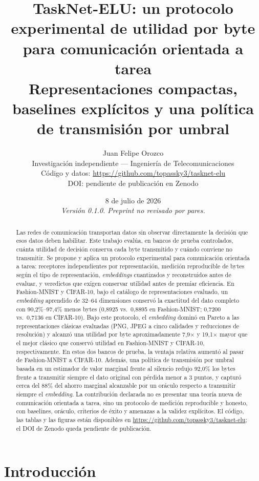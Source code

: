 \documentclass[11pt,letterpaper]{article}
\title{\bfseries TaskNet-ELU: un protocolo experimental de utilidad por byte\\
para comunicaci\'on orientada a tarea\\[0.35em]
\large Representaciones compactas, baselines expl\'icitos y una pol\'itica de transmisi\'on por umbral}
\author{Juan Felipe Orozco\\
\small Investigaci\'on independiente --- Ingenier\'ia de Telecomunicaciones\\
\small C\'odigo y datos: \url{https://github.com/topassky3/tasknet-elu}\\
\small DOI: pendiente de publicaci\'on en Zenodo}
\date{8 de julio de 2026\\[0.4em]\small\itshape Versi\'on 0.1.0. Preprint no revisado por pares.}
\begin{document}
\maketitle

\begin{abstract}
\noindent
Las redes de comunicaci\'on transportan datos sin observar directamente la decisi\'on que esos datos deben habilitar. Este trabajo eval\'ua, en bancos de prueba controlados, cu\'anta utilidad de decisi\'on conserva cada byte transmitido y cu\'ando conviene no transmitir. Se propone y aplica un protocolo experimental para comunicaci\'on orientada a tarea: receptores independientes por representaci\'on, medici\'on reproducible de bytes seg\'un el tipo de representaci\'on, \emph{embeddings} cuantizados y reconstruidos antes de evaluar, y veredictos que exigen conservar utilidad antes de premiar eficiencia. En Fashion-MNIST y CIFAR-10, bajo el cat\'alogo de representaciones evaluado, un \emph{embedding} aprendido de 32--64 dimensiones conserv\'o la exactitud del dato completo con 90{,}2\%--97{,}4\% menos bytes (0{,}8925 vs.\ 0{,}8895 en Fashion-MNIST; 0{,}7200 vs.\ 0{,}7136 en CIFAR-10). Bajo este protocolo, el \emph{embedding} domin\'o en Pareto a las representaciones cl\'asicas evaluadas (PNG, JPEG a cinco calidades y reducciones de resoluci\'on) y alcanz\'o una utilidad por byte aproximadamente 7{,}9$\times$ y 19{,}1$\times$ mayor que el mejor cl\'asico que conserv\'o utilidad en Fashion-MNIST y CIFAR-10, respectivamente. En estos dos bancos de prueba, la ventaja relativa aument\'o al pasar de Fashion-MNIST a CIFAR-10. Adem\'as, una pol\'itica de transmisi\'on por umbral basada en un estimador de valor marginal frente al silencio redujo 92{,}0\% los bytes frente a transmitir siempre el dato original con p\'erdida menor a 3 puntos, y captur\'o cerca del 88\% del ahorro marginal alcanzable por un or\'aculo respecto a transmitir siempre el \emph{embedding}. La contribuci\'on declarada no es presentar una teor\'ia nueva de comunicaci\'on orientada a tarea, sino un protocolo de medici\'on reproducible y honesto, con baselines, or\'aculo, criterios de \'exito y amenazas a la validez expl\'icitos. El c\'odigo, las tablas y las figuras est\'an disponibles en \url{https://github.com/topassky3/tasknet-elu}; el DOI de Zenodo queda pendiente de publicaci\'on.
\end{abstract}

\section{Introducci\'on}
\end{document}
